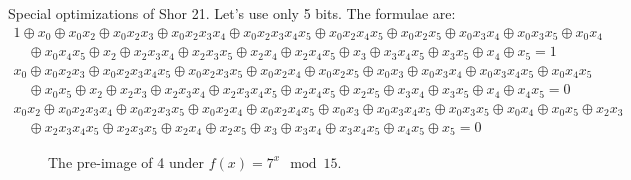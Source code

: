 \documentclass{article}
\begin{document}
\begin{refsection}
Special optimizations of Shor 21. Let's use only 5 bits. The formulae are:
\[\begin{array}{l}
1 \oplus x_0 \oplus x_0x_2 \oplus x_0x_2x_3 \oplus x_0x_2x_3x_4 \oplus x_0x_2x_3x_4x_5 \oplus x_0x_2x_4x_5 \oplus x_0x_2x_5 \oplus x_0x_3x_4 \oplus x_0x_3x_5 \oplus x_0x_4 \\
  \quad \oplus x_0x_4x_5 \oplus x_2 \oplus x_2x_3x_4 \oplus x_2x_3x_5 \oplus x_2x_4 \oplus x_2x_4x_5 \oplus x_3 \oplus x_3x_4x_5 \oplus x_3x_5 \oplus x_4 \oplus x_5 = 1
\\[2ex]
x_0 \oplus x_0x_2x_3 \oplus x_0x_2x_3x_4x_5 \oplus x_0x_2x_3x_5 \oplus x_0x_2x_4 \oplus x_0x_2x_5 \oplus x_0x_3 \oplus x_0x_3x_4 \oplus x_0x_3x_4x_5 \oplus x_0x_4x_5 \\
  \quad \oplus x_0x_5 \oplus x_2 \oplus x_2x_3 \oplus x_2x_3x_4 \oplus x_2x_3x_4x_5 \oplus x_2x_4x_5 \oplus x_2x_5 \oplus x_3x_4 \oplus x_3x_5 \oplus x_4 \oplus x_4x_5 = 0
\\[2ex]
x_0x_2 \oplus x_0x_2x_3x_4 \oplus x_0x_2x_3x_5 \oplus x_0x_2x_4 \oplus x_0x_2x_4x_5 \oplus x_0x_3 \oplus x_0x_3x_4x_5 \oplus x_0x_3x_5 \oplus x_0x_4 \oplus x_0x_5 \oplus x_2x_3 \\
  \quad \oplus x_2x_3x_4x_5 \oplus x_2x_3x_5 \oplus x_2x_4 \oplus x_2x_5 \oplus x_3 \oplus x_3x_4 \oplus x_3x_4x_5 \oplus x_4x_5 \oplus x_5 = 0
\end{array}\]

\begin{wrapfigure}{r}{5cm}
\begin{center}
\end{center}
\caption{\label{fig:preimage}The pre-image of 4 under $f(x) = 7^x \mod 15$.}
\end{wrapfigure}

\end{refsection}
\end{document}
